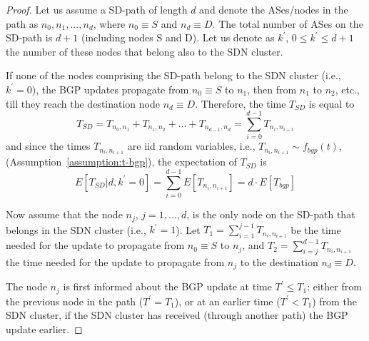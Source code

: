 \begin{proof}
Let us assume a SD-path of length $d$ and denote the ASes/nodes in the path as $n_{0}, n_{1}, ..., n_{d}$, where $n_{0}\equiv S$ and $n_{d}\equiv D$. The total number of ASes on the SD-path is $d+1$  (including nodes S and D). Let us denote as $k^{'}$, $0\leq k^{'} \leq d+1$ the number of these nodes that belong also to the SDN cluster. 

If none of the nodes comprising the SD-path belong to the SDN cluster (i.e., $k^{'} = 0$), the BGP updates propagate from $n_{0}\equiv S$ to $n_{1}$, then from $n_{1}$ to $n_{2}$, etc., till they reach the destination node $n_{d}\equiv D$. Therefore, the time $T_{SD}$ is equal to
\begin{equation}\label{eq:Tsd-sum-d-Ti_i+1}
T_{SD} = T_{n_{0},n_{1}} + T_{n_{1},n_{2}} + ... + T_{n_{d-1},n_{d}} = \sum_{i = 0}^{d-1}T_{n_{i},n_{i+1}}
\end{equation}
and since the times $T_{n_{i},n_{i+1}}$ are iid random variables, i.e., $T_{n_{i},n_{i+1}}\sim f_{bgp}(t)$, (Assumption~\ref{assumption:t-bgp}), the expectation of $T_{SD}$ is
\begin{equation}\label{eq:Tsd-sum-d-Tbgp}
E[T_{SD}|d,k^{'}=0] = \sum_{i = 0}^{d-1}E\left[T_{n_{i},n_{i+1}}\right] = d\cdot E[T_{bgp}]
\end{equation}

Now assume that the node $n_{j}$, $j=1,...,d$, is the only node on the SD-path that belongs in the SDN cluster (i.e., $k^{'}=1$). Let $T_{1} = \sum_{i=1}^{j-1}T_{n_{i},n_{i+1}}$ be the time needed for the update to propagate from $n_{0}\equiv S$ to $n_{j}$, and $T_{2} = \sum_{i=j}^{d-1}T_{n_{i},n_{i+1}}$ the time needed for the update to propagate from $n_{j}$ to the destination $n_{d} \equiv D$.


The node $n_{j}$ is first informed about the BGP update at time $T^{'}\leq T_{1}$: either from the previous node in the path ($T^{'}=T_{1}$), or at an earlier time ($T^{'}<T_{1}$) from the SDN cluster, if the SDN cluster has received (through another path) the BGP update earlier.


\end{proof}
